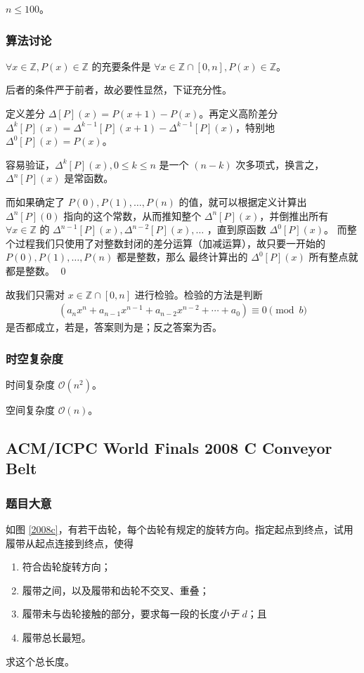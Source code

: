 				$n \le 100$。
			\subsubsection{算法讨论}
				\begin{theorem}
					$\forall x \in \mathbb{Z}, P(x) \in \mathbb{Z}$ 的充要条件是
					$\forall x \in \mathbb{Z} \cap [0, n], P(x) \in \mathbb{Z}$。
				\end{theorem}
				\begin{pf}
					后者的条件严于前者，故必要性显然，下证充分性。
					
					定义差分 $\Delta [P](x) = P(x + 1) - P(x)$。再定义高阶差分 $\Delta^k [P](x) = \Delta^{k - 1} [P](x + 1) - \Delta^{k - 1} [P](x) $，特别地 $\Delta^0 [P](x) = P(x)$。
						
					容易验证，$\Delta^k [P](x), 0 \le k \le n$ 是一个 $(n - k)$ 次多项式，换言之，$\Delta^n [P](x)$ 是常函数。
					
					而如果确定了 $P(0), P(1), \ldots, P(n)$ 的值，就可以根据定义计算出 $\Delta^n [P](0)$ 指向的这个常数，从而推知整个 $\Delta^n [P](x)$，并倒推出所有 $\forall x \in \mathbb{Z}$ 的 $\Delta^{n - 1} [P](x) , \Delta^{n - 2} [P](x), \ldots$ ，直到原函数 $ \Delta^{0} [P](x)$。
					而整个过程我们只使用了对整数封闭的差分运算（加减运算），故只要一开始的 $P(0), P(1), \ldots, P(n)$  都是整数，那么 最终计算出的 $ \Delta^{0} [P](x)$ 所有整点就都是整数。%
					\qed
				\end{pf}
				故我们只需对 $x \in \mathbb{Z} \cap [0, n]$ 进行检验。检验的方法是判断
				\begin{align}
					 \left( a_nx^n + a_{n - 1} x^{n - 1} + a_{n - 2} x^{n - 2}  + \cdots + a_{0} %
					  \right) \equiv 0 \pmod{b}
				\end{align}
				是否都成立，若是，答案则为是；反之答案为否。
			\subsubsection{时空复杂度}
				
				时间复杂度 $\mathcal{O}\left(n^2\right)$。
					
				空间复杂度 $\mathcal{O}\left(n\right)$。
		\newpage
		\subsection{ACM/ICPC World Finals 2008 C Conveyor Belt}
			\subsubsection{题目大意}
					如图 \ref{2008c}，有若干齿轮，每个齿轮有规定的旋转方向。指定起点到终点，试用履带从起点连接到终点，使得
					\begin{enumerate}
						\item 符合齿轮旋转方向；
						\item 履带之间，以及履带和齿轮不交叉、重叠；
						\item 履带未与齿轮接触的部分，要求每一段的长度\emph{小于} $d$；且
						\item 履带总长最短。
					\end{enumerate}
					求这个总长度。
					
